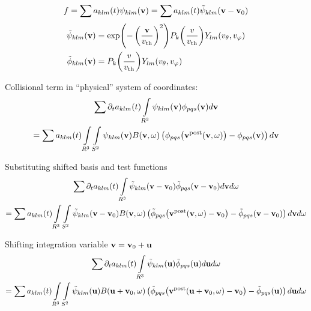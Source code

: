 \documentclass{article}[draft]
\begin{document}

\begin{align*}
f = 
\sum a_{klm}\of{t}
{\psi}_{klm}\of{\vect{v}}
=
\sum a_{klm}\of{t}
\tilde{\psi}_{klm}\of{\vect{v}-\vect{v}_0}
\end{align*}
\begin{align*}
\tilde{\psi}_{klm}\of{\vect{v}} &= \exp\of{-\left(\frac{\vect{v}}{\vth}\right)^2} P_k\of{\frac{\vr}{\vth}} Y_{lm}\of{\vtheta, \vphi}
\\
\tilde{\phi}_{klm}\of{\vect{v}} &= P_k\of{\frac{\vr}{\vth}} Y_{lm}\of{\vtheta, \vphi}
\end{align*}

Collisional term in ``physical'' system of coordinates:
\begin{multline*}
\sum 
\partial_t a_{klm}\of{t}
\myint_{R^3}
\psi_{klm}\of{\vect{v}}
\phi_{pqs}\of{\vect{v}}
d\vect{v}
\\
=
\sum 
a_{klm}\of{t}
\myint_{R^3}
\myint_{S^2} 
\psi_{klm}\of{\vect{v}}
B\of{\vect{v}, \vect{\omega}}
\left( 
\phi_{pqs}\of{\vect{v}^\text{post}\of{\vect{v},\vect{\omega}}}
-
\phi_{pqs}\of{\vect{v}}
\right) 
d\vect{v}
\end{multline*}

Substituting shifted basis and test functions
\begin{multline*}
\sum 
\partial_t a_{klm}\of{t}
\myint_{R^3}
\tilde{\psi}_{klm}\of{\vect{v}-\vect{v}_0}
\tilde{\phi}_{pqs}\of{\vect{v}-\vect{v}_0}
d\vect{v} d\vect{\omega}
\\
=
\sum 
a_{klm}\of{t}
\myint_{R^3}
\myint_{S^2} 
\tilde{\psi}_{klm}\of{\vect{v}-\vect{v}_0}
B\of{\vect{v}, \vect{\omega}}
\left( 
\tilde{\phi}_{pqs}\of{\vect{v}^\text{post}\of{\vect{v},\vect{\omega}}-\vect{v}_0}
-
\tilde{\phi}_{pqs}\of{\vect{v}-\vect{v}_0}
\right) 
d\vect{v} d\vect{\omega}
\end{multline*}

Shifting integration variable $\mathbf{v} = \mathbf{v}_0 + \mathbf{u}$
\begin{multline}\label{eq:shiftedColOp}
\sum 
\partial_t a_{klm}\of{t}
\myint_{R^3}
\tilde{\psi}_{klm}\of{\vect{u}}
\tilde{\phi}_{pqs}\of{\vect{u}}
d\vect{u} d\vect{\omega}
\\
=
\sum 
a_{klm}\of{t}
\myint_{R^3}
\myint_{S^2} 
\tilde{\psi}_{klm}\of{\vect{u}}
B\of{\vect{u}+\vect{v}_0, \vect{\omega}}
\left( 
\tilde{\phi}_{pqs}\of{\vect{v}^\text{post}\of{\vect{u}+\vect{v}_0,\vect{\omega}}-\vect{v}_0}
-
\tilde{\phi}_{pqs}\of{\vect{u}}
\right) 
d\vect{u} d\vect{\omega}
\end{multline}
\end{document}
